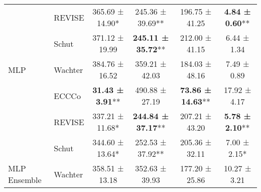 \begin{table}
{\begin{tabular}[t]{llcccc}
 & REVISE & 365.69 ± 14.90*\hphantom{*} & 245.36 ± 39.69** & 196.75 ± 41.25\hphantom{*}\hphantom{*} & \textbf{4.84 ± 0.60}**\\

 & Schut & 371.12 ± 19.99\hphantom{*}\hphantom{*} & \textbf{245.11 ± 35.72}** & 212.00 ± 41.15\hphantom{*}\hphantom{*} & 6.44 ± 1.34\hphantom{*}\hphantom{*}\\

\multirow{-4}{*}{\raggedright\arraybackslash MLP} & Wachter & 384.76 ± 16.52\hphantom{*}\hphantom{*} & 359.21 ± 42.03\hphantom{*}\hphantom{*} & 184.03 ± 48.16\hphantom{*}\hphantom{*} & 7.49 ± 0.89\hphantom{*}\hphantom{*}\\
\cmidrule{1-6}
 & ECCCo & \textbf{31.43 ± 3.91}** & 490.88 ± 27.19\hphantom{*}\hphantom{*} & \textbf{73.86 ± 14.63}** & 17.92 ± 4.17\hphantom{*}\hphantom{*}\\

 & REVISE & 337.21 ± 11.68*\hphantom{*} & \textbf{244.84 ± 37.17}** & 207.21 ± 43.20\hphantom{*}\hphantom{*} & \textbf{5.78 ± 2.10}**\\

 & Schut & 344.60 ± 13.64*\hphantom{*} & 252.53 ± 37.92** & 205.36 ± 32.11\hphantom{*}\hphantom{*} & 7.00 ± 2.15*\hphantom{*}\\

\multirow{-4}{*}{\raggedright\arraybackslash MLP Ensemble} & Wachter & 358.51 ± 13.18\hphantom{*}\hphantom{*} & 352.63 ± 39.93\hphantom{*}\hphantom{*} & 177.20 ± 25.86\hphantom{*}\hphantom{*} & 10.27 ± 3.21\hphantom{*}\hphantom{*}\\
\bottomrule
\end{tabular}}
\end{table}
